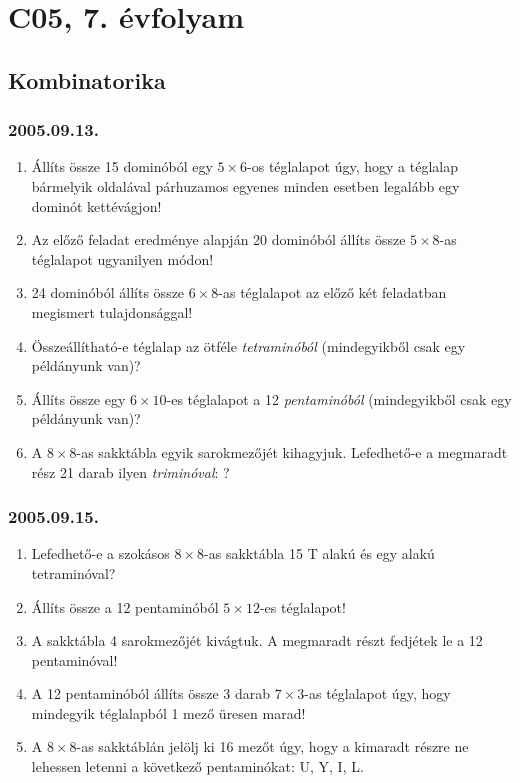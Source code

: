 \chapter{C05, 7. évfolyam}
\section{Kombinatorika}

\subsection*{2005.09.13.}
\begin{enumerate}
\item Állíts össze 15 dominóból egy $5\times 6$-os
téglalapot úgy, hogy a téglalap bármelyik oldalával
párhuzamos egyenes minden esetben legalább egy dominót kettévágjon!
\item Az előző feladat eredménye alapján 20 dominóból állíts össze $5\times 8$-as téglalapot ugyanilyen módon!
\item 24 dominóból állíts össze $6\times 8$-as téglalapot az előző két feladatban megismert tulajdonsággal!
\item Összeállítható-e téglalap az ötféle \textit{tetraminóból} (mindegyikből csak egy példányunk van)?
\item Állíts össze egy $6\times 10$-es téglalapot
a 12 \textit{pentaminóból} (mindegyikből csak egy példányunk van)?
\item A $8\times 8$-as sakktábla egyik sarokmezőjét kihagyjuk. Lefedhető-e a megmaradt rész 21 darab ilyen \textit{tri\-minóval}: 
?
\end{enumerate}

\subsection*{2005.09.15.}
\begin{enumerate}
\item Lefedhető-e a szokásos $8\times 8$-as sakktábla 15 T alakú és egy
alakú tetraminóval?
\item Állíts össze a 12 pentaminóból $5\times 12$-es
téglalapot!
\item A sakktábla 4 sarokmezőjét kivágtuk.
A megmaradt részt fedjétek le a 12 pentaminóval!
\item A 12 pentaminóból állíts össze 3 darab $7\times 3$-as téglalapot úgy, hogy mindegyik téglalapból 1 mező üresen marad! 
\item A $8\times 8$-as sakktáblán jelölj ki 16 mezőt úgy, hogy a kimaradt részre ne lehessen letenni a következő pentaminókat: U, Y, I, L.
\end{enumerate}


